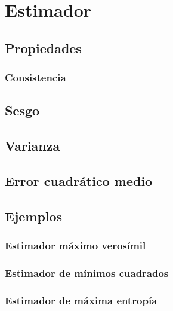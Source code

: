 \hypertarget{estimador}{%
\section{Estimador}\label{estimador}}

\hypertarget{propiedades}{%
\subsection{Propiedades}\label{propiedades}}

\hypertarget{consistencia}{%
\subsubsection{Consistencia}\label{consistencia}}

\hypertarget{sesgo}{%
\subsection{Sesgo}\label{sesgo}}

\hypertarget{varianza}{%
\subsection{Varianza}\label{varianza}}

\hypertarget{error-cuadruxe1tico-medio}{%
\subsection{Error cuadrático medio}\label{error-cuadruxe1tico-medio}}

\hypertarget{ejemplos}{%
\subsection{Ejemplos}\label{ejemplos}}

\hypertarget{estimador-muxe1ximo-verosuxedmil}{%
\subsubsection{Estimador máximo
verosímil}\label{estimador-muxe1ximo-verosuxedmil}}

\hypertarget{estimador-de-muxednimos-cuadrados}{%
\subsubsection{Estimador de mínimos
cuadrados}\label{estimador-de-muxednimos-cuadrados}}

\hypertarget{estimador-de-muxe1xima-entropuxeda}{%
\subsubsection{Estimador de máxima
entropía}\label{estimador-de-muxe1xima-entropuxeda}}

